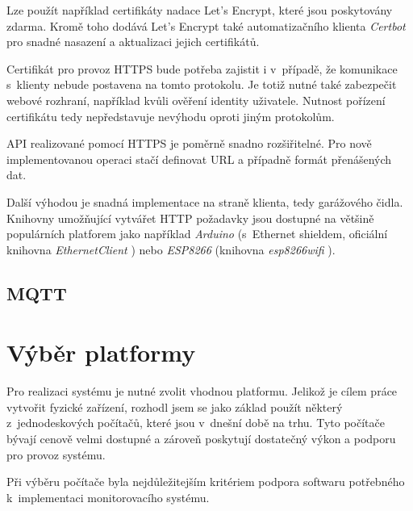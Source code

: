 Lze použít například certifikáty nadace Let's Encrypt, které jsou poskytovány  zdarma. Kromě toho dodává Let's Encrypt také automatizačního klienta \textit{Certbot} \cite{certbot} pro snadné nasazení a aktualizaci jejich certifikátů.

Certifikát pro provoz HTTPS bude potřeba zajistit i v~případě, že komunikace s~klienty nebude postavena na tomto protokolu. Je totiž nutné také zabezpečit webové rozhraní, například kvůli ověření identity uživatele. Nutnost pořízení certifikátu tedy nepředstavuje nevýhodu oproti jiným protokolům.

API realizované pomocí HTTPS je poměrně snadno rozšiřitelné. Pro nově implementovanou operaci stačí definovat URL a případně formát přenášených dat.

Další výhodou je snadná implementace na straně klienta, tedy garážového čidla. Knihovny umožňující vytvářet HTTP požadavky jsou dostupné na většině populárních platforem jako například \textit{Arduino} (s~Ethernet shieldem, oficiální knihovna \textit{EthernetClient} \cite{ard_web}) nebo \textit{ESP8266} (knihovna \textit{esp8266wifi} \cite{esp_web}).

\subsection{MQTT}

\cite{mqtt_valerie}

\section{Výběr platformy}

Pro realizaci systému je nutné zvolit vhodnou platformu. Jelikož je cílem práce vytvořit fyzické zařízení, rozhodl jsem se jako základ použít některý z~jednodeskových počítačů, které jsou v~dnešní době na trhu. Tyto počítače bývají cenově velmi dostupné a zároveň poskytují dostatečný výkon a podporu pro provoz systému.

Při výběru počítače byla nejdůležitejším kritériem podpora softwaru potřebného k~implementaci monitorovacího systému.